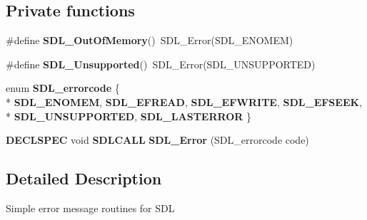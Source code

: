 \subsection*{Private functions}
\begin{DoxyCompactItemize}
\item 
\#define {\bfseries S\+D\+L\+\_\+\+Out\+Of\+Memory}()~S\+D\+L\+\_\+\+Error(S\+D\+L\+\_\+\+E\+N\+O\+M\+E\+M)\label{_s_d_l__error_8h_a440edcb93dba4e39c88ecf8dc676b6c1}

\item 
\#define {\bfseries S\+D\+L\+\_\+\+Unsupported}()~S\+D\+L\+\_\+\+Error(S\+D\+L\+\_\+\+U\+N\+S\+U\+P\+P\+O\+R\+T\+E\+D)\label{_s_d_l__error_8h_a45dc695e3a906dd40f00e204ace3bcf5}

\item 
enum {\bfseries S\+D\+L\+\_\+errorcode} \{ \\*
{\bfseries S\+D\+L\+\_\+\+E\+N\+O\+M\+E\+M}, 
{\bfseries S\+D\+L\+\_\+\+E\+F\+R\+E\+A\+D}, 
{\bfseries S\+D\+L\+\_\+\+E\+F\+W\+R\+I\+T\+E}, 
{\bfseries S\+D\+L\+\_\+\+E\+F\+S\+E\+E\+K}, 
\\*
{\bfseries S\+D\+L\+\_\+\+U\+N\+S\+U\+P\+P\+O\+R\+T\+E\+D}, 
{\bfseries S\+D\+L\+\_\+\+L\+A\+S\+T\+E\+R\+R\+O\+R}
 \}\label{_s_d_l__error_8h_a5c417ba725f086b33390a5e5d5dabfe1}

\item 
{\bf D\+E\+C\+L\+S\+P\+E\+C} void {\bf S\+D\+L\+C\+A\+L\+L} {\bfseries S\+D\+L\+\_\+\+Error} (S\+D\+L\+\_\+errorcode code)\label{_s_d_l__error_8h_a6555e5bb07af0a69c345366326897b22}

\end{DoxyCompactItemize}


\subsection{Detailed Description}
Simple error message routines for S\+D\+L 